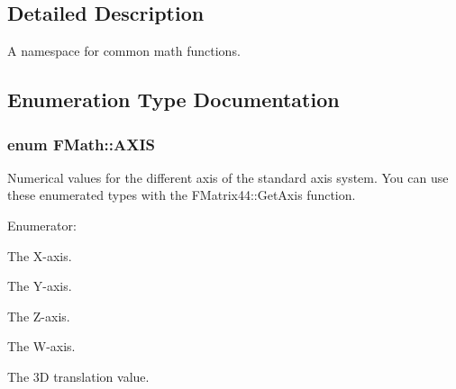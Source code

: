 \subsection{Detailed Description}
A namespace for common math functions. 

\subsection{Enumeration Type Documentation}
\hypertarget{namespaceFMath_a6cebb48ac4d487860bfb3000dc83464f}{
\subsubsection[{AXIS}]{\setlength{\rightskip}{0pt plus 5cm}enum {\bf FMath::AXIS}}}
\label{namespaceFMath_a6cebb48ac4d487860bfb3000dc83464f}
Numerical values for the different axis of the standard axis system. You can use these enumerated types with the FMatrix44::GetAxis function. \begin{Desc}
\item[Enumerator: ]\par
\begin{description}
\item[{\em 
\hypertarget{namespaceFMath_a6cebb48ac4d487860bfb3000dc83464fa97075b67af17b9e1e790e1ae7b8ddfea}{
X}
\label{namespaceFMath_a6cebb48ac4d487860bfb3000dc83464fa97075b67af17b9e1e790e1ae7b8ddfea}
}]The X-\/axis. \item[{\em 
\hypertarget{namespaceFMath_a6cebb48ac4d487860bfb3000dc83464fa5f8f70917a76852b2c746131d636b37f}{
Y}
\label{namespaceFMath_a6cebb48ac4d487860bfb3000dc83464fa5f8f70917a76852b2c746131d636b37f}
}]The Y-\/axis. \item[{\em 
\hypertarget{namespaceFMath_a6cebb48ac4d487860bfb3000dc83464fa2efeab595c04bfae88c455ac09a525fe}{
Z}
\label{namespaceFMath_a6cebb48ac4d487860bfb3000dc83464fa2efeab595c04bfae88c455ac09a525fe}
}]The Z-\/axis. \item[{\em 
\hypertarget{namespaceFMath_a6cebb48ac4d487860bfb3000dc83464fa0f98577a60c766eb7fcbea869ed2bd60}{
W}
\label{namespaceFMath_a6cebb48ac4d487860bfb3000dc83464fa0f98577a60c766eb7fcbea869ed2bd60}
}]The W-\/axis. \item[{\em 
\hypertarget{namespaceFMath_a6cebb48ac4d487860bfb3000dc83464fa1d8d9e680e2a56fd65804c8177f248f3}{
TRANS}
\label{namespaceFMath_a6cebb48ac4d487860bfb3000dc83464fa1d8d9e680e2a56fd65804c8177f248f3}
}]The 3D translation value. \end{description}
\end{Desc}



